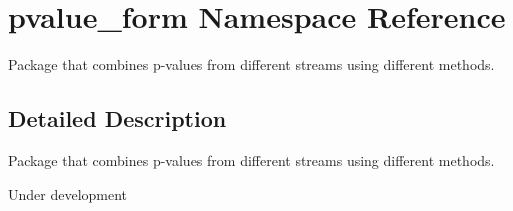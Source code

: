 \hypertarget{namespacepvalue__form}{\section{pvalue\-\_\-form Namespace Reference}
\label{namespacepvalue__form}
}


\begin{DoxyVerb}Package that combines p-values from different streams using different methods.\end{DoxyVerb}
  




\subsection{Detailed Description}
\begin{DoxyVerb}Package that combines p-values from different streams using different methods.\end{DoxyVerb}
 Under development 